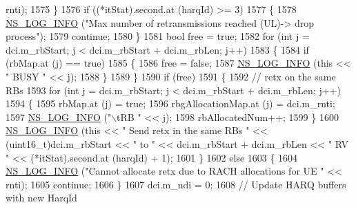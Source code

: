 \begin{DoxyCode}
      rnti);
1575                 \}
1576               \textcolor{keywordflow}{if} ((*itStat).second.at (harqId) >= 3)
1577                 \{
1578                   \hyperlink{group__logging_gafbd73ee2cf9f26b319f49086d8e860fb}{NS\_LOG\_INFO} (\textcolor{stringliteral}{"Max number of retransmissions reached (UL)-> drop process"});
1579                   \textcolor{keywordflow}{continue};
1580                 \}
1581               \textcolor{keywordtype}{bool} free = \textcolor{keyword}{true};
1582               \textcolor{keywordflow}{for} (\textcolor{keywordtype}{int} j = dci.m\_rbStart; j < dci.m\_rbStart + dci.m\_rbLen; j++)
1583                 \{
1584                   \textcolor{keywordflow}{if} (rbMap.at (j) == \textcolor{keyword}{true})
1585                     \{
1586                       free = \textcolor{keyword}{false};
1587                       \hyperlink{group__logging_gafbd73ee2cf9f26b319f49086d8e860fb}{NS\_LOG\_INFO} (\textcolor{keyword}{this} << \textcolor{stringliteral}{" BUSY "} << j);
1588                     \}
1589                 \}
1590               \textcolor{keywordflow}{if} (free)
1591                 \{
1592                   \textcolor{comment}{// retx on the same RBs}
1593                   \textcolor{keywordflow}{for} (\textcolor{keywordtype}{int} j = dci.m\_rbStart; j < dci.m\_rbStart + dci.m\_rbLen; j++)
1594                     \{
1595                       rbMap.at (j) = \textcolor{keyword}{true};
1596                       rbgAllocationMap.at (j) = dci.m\_rnti;
1597                       \hyperlink{group__logging_gafbd73ee2cf9f26b319f49086d8e860fb}{NS\_LOG\_INFO} (\textcolor{stringliteral}{"\(\backslash\)tRB "} << j);
1598                       rbAllocatedNum++;
1599                     \}
1600                   \hyperlink{group__logging_gafbd73ee2cf9f26b319f49086d8e860fb}{NS\_LOG\_INFO} (\textcolor{keyword}{this} << \textcolor{stringliteral}{" Send retx in the same RBs "} << (uint16\_t)dci.m\_rbStart 
      << \textcolor{stringliteral}{" to "} << dci.m\_rbStart + dci.m\_rbLen << \textcolor{stringliteral}{" RV "} << (*itStat).second.at (harqId) + 1);
1601                 \}
1602               \textcolor{keywordflow}{else}
1603                 \{
1604                   \hyperlink{group__logging_gafbd73ee2cf9f26b319f49086d8e860fb}{NS\_LOG\_INFO} (\textcolor{stringliteral}{"Cannot allocate retx due to RACH allocations for UE "} << rnti);
1605                   \textcolor{keywordflow}{continue};
1606                 \}
1607               dci.m\_ndi = 0;
1608               \textcolor{comment}{// Update HARQ buffers with new HarqId}

\end{DoxyCode}
